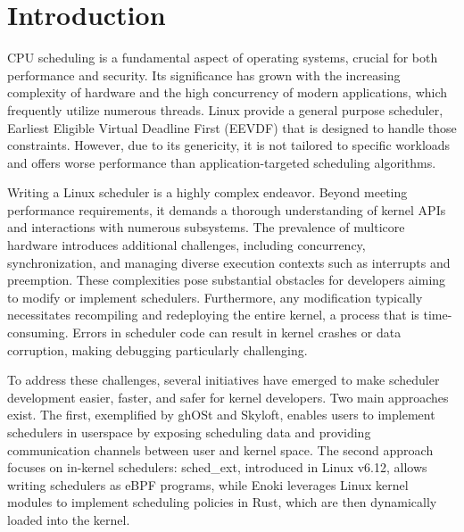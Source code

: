 
\section{Introduction}

\par CPU scheduling is a fundamental aspect of operating systems, crucial for both performance and security. Its significance has grown with the increasing complexity of hardware and the high concurrency of modern applications, which frequently utilize numerous threads\cite{hybridsched}. Linux provide a general purpose scheduler, Earliest Eligible Virtual Deadline First (EEVDF)\cite{eevdf} that is designed to handle those constraints. However, due to its genericity, it is not tailored to specific workloads and offers worse performance than application-targeted scheduling algorithms\cite{ghost,shenango}.


Writing a Linux scheduler is a highly complex endeavor. Beyond meeting performance requirements, it demands a thorough understanding of kernel APIs and interactions with numerous subsystems. The prevalence of multicore hardware introduces additional challenges, including concurrency, synchronization, and managing diverse execution contexts such as interrupts and preemption. These complexities pose substantial obstacles for developers aiming to modify or implement schedulers. Furthermore, any modification typically necessitates recompiling and redeploying the entire kernel, a process that is time-consuming. Errors in scheduler code can result in kernel crashes or data corruption, making debugging particularly challenging.

To address these challenges, several initiatives have emerged to make scheduler development easier, faster, and safer for kernel developers. Two main approaches exist. The first, exemplified by ghOSt\cite{ghost} and Skyloft\cite{skyloft}, enables users to implement schedulers in userspace by exposing scheduling data and providing communication channels between user and kernel space. The second approach focuses on in-kernel schedulers: sched\_ext\cite{schedext}, introduced in Linux v6.12, allows writing schedulers as eBPF\cite{ebpf} programs, while Enoki\cite{enoki} leverages Linux kernel modules to implement scheduling policies in Rust, which are then dynamically loaded into the kernel.

